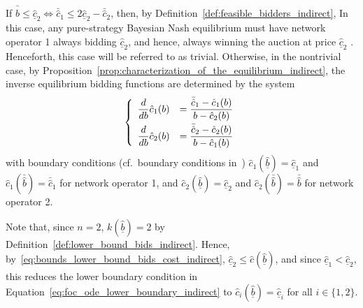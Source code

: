 If $\bar{\hat{b}} \leq \underline{\hat{c}}_2 \iff \bar{\hat{c}}_1 \le 2\underline{\hat{c}}_2 - \bar{\hat{c}}_2$, then, by Definition~\ref{def:feasible_bidders_indirect},  In this case, any pure-strategy Bayesian Nash equilibrium must have network operator 1 always bidding $\underline{\hat{c}}_2$, and hence, always winning the auction at price $\underline{\hat{c}}_2$ \cite{KaplanZamir2007}. Henceforth, this case will be referred to as trivial. Otherwise, in the nontrivial case, by Proposition~\ref{prop:characterization_of_the_equilibrium_indirect}, the inverse equilibrium bidding functions are determined by the system
\begin{equation}
  \label{eq:foc_restricted_indirect}
  \left\{
  \begin{array}{ll}
    \displaystyle\frac{d}{db}\hat{c}_1(b) &= \displaystyle\frac{\bar{\hat{c}}_1 - \hat{c}_1(b)}{b - \hat{c}_2(b)} \\[2ex]
    \displaystyle\frac{d}{db}\hat{c}_2(b) &= \displaystyle\frac{\bar{\hat{c}}_2 - \hat{c}_2(b)}{b - \hat{c}_1(b)}
  \end{array}
  \right.\\[1cm]
\end{equation}
with boundary conditions (cf.~boundary conditions in~\cite{KaplanZamir2007}) $\hat{c}_1(\underline{\hat{b}}) = \underline{\hat{c}}_1$ and $\hat{c}_1(\bar{\hat{b}}) = \bar{\hat{c}}_1$ for network operator 1, and $\hat{c}_2(\underline{\hat{b}}) = \underline{\hat{c}}_2$ and $\hat{c}_2(\bar{\hat{b}}) = \bar{\hat{b}}$ for network operator 2.

Note that, since $n=2$, $k(\underline{\hat{b}})=2$ by Definition~\ref{def:lower_bound_bids_indirect}. Hence, by~\eqref{eq:bounds_lower_bound_bids_cost_indirect}, $\underline{\hat{c}}_2\leq \hat{c}(\underline{\hat{b}})$, and since $\underline{\hat{c}}_1 < \underline{\hat{c}}_2$, this reduces the lower boundary condition in Equation~\eqref{eq:foc_ode_lower_boundary_indirect} to $\hat{c}_i(\underline{\hat{b}}) = \underline{\hat{c}}_i$ for all $i\in\{1,2\}$.

